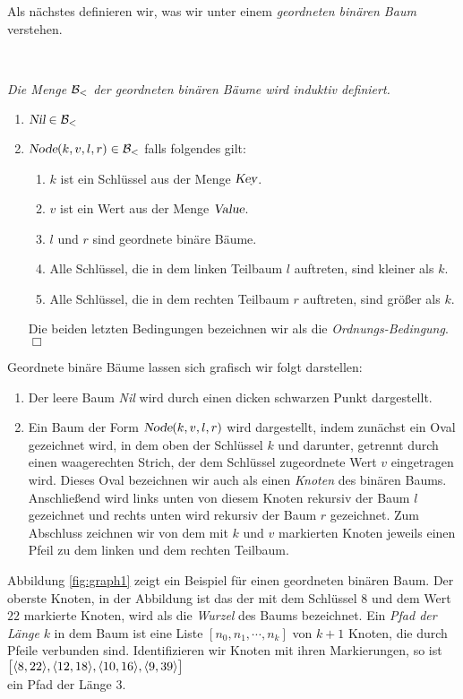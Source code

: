 \noindent
Als n\"achstes definieren wir, was wir unter einem \emph{geordneten bin\"aren Baum} verstehen.
\begin{Definition} \hspace*{\fill} \\
{\em
  Die Menge $\mathcal{B}_<$ der \emph{geordneten bin\"aren B\"aume} wird induktiv definiert.
  \begin{enumerate}
  \item $\textsl{Nil} \in \mathcal{B}_<$
  \item $\textsl{Node}(k, v, l, r) \in \mathcal{B}_<$ \quad falls folgendes gilt:
        \begin{enumerate}
        \item $k$ ist ein Schl\"ussel aus der Menge $\textsl{Key}$.
        \item $v$ ist ein Wert aus der Menge $\textsl{Value}$.
        \item $l$ und $r$ sind geordnete bin\"are B\"aume.
        \item Alle Schl\"ussel, die in dem linken Teilbaum $l$ auftreten,
              sind kleiner als $k$.
        \item Alle Schl\"ussel, die in dem rechten Teilbaum $r$ auftreten,
              sind gr\"o{\ss}er als $k$.
        \end{enumerate}
        Die beiden letzten  Bedingungen bezeichnen wir als die \emph{Ordnungs-Bedingung}.
        \hspace*{\fill} $\Box$
  \end{enumerate}
}  
\end{Definition}
Geordnete bin\"are B\"aume lassen sich grafisch wir folgt darstellen:
\begin{enumerate}
\item Der leere Baum \textsl{Nil} wird durch einen dicken schwarzen Punkt dargestellt.
\item Ein Baum der Form $\textsl{Node}(k,v,l,r)$ wird dargestellt,  indem zun\"achst ein
      Oval gezeichnet wird, in dem oben der Schl\"ussel $k$ und darunter, getrennt durch
      einen waagerechten Strich, der dem Schl\"ussel zugeordnete Wert $v$ eingetragen wird.
      Dieses Oval bezeichnen wir auch als einen \emph{Knoten} des bin\"aren Baums.
      Anschlie{\ss}end wird links unten von diesem Knoten rekursiv der Baum $l$ ge\-zeich\-net
      und  rechts unten wird rekursiv der Baum $r$ gezeichnet. Zum Abschluss zeichnen wir
      von dem mit $k$ und $v$ markierten Knoten jeweils einen Pfeil zu dem linken und dem
      rechten Teilbaum.
\end{enumerate}
Abbildung \ref{fig:graph1} zeigt ein Beispiel f\"ur einen
geordneten bin\"aren Baum.  Der oberste Knoten, in der Abbildung ist das der mit dem Schl\"ussel
$8$ und dem Wert $22$ markierte Knoten, wird als die \emph{Wurzel} des Baums bezeichnet.
Ein \emph{Pfad der L\"ange} $k$ in dem Baum ist eine Liste $[n_0,n_1, \cdots, n_k]$ von
$k+1$ Knoten, die durch Pfeile verbunden sind. Identifizieren wir Knoten mit ihren
Markierungen, so ist \\[0.1cm]
\hspace*{1.3cm} $\bigl[ \pair(8,22), \pair(12,18), \pair(10,16), \pair(9,39) \bigr]$ \\[0.1cm]
ein Pfad der L\"ange 3.


